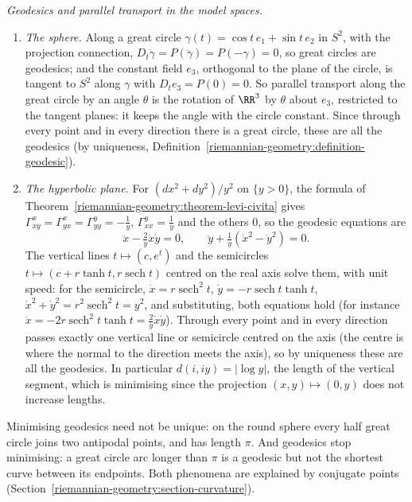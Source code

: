 \begin{example}\label{riemannian-geometry:example-geodesics-models}
\emph{Geodesics and parallel transport in the model spaces.}
\begin{enumerate}
\item \emph{The sphere.} Along a great circle $\gamma(t) = \cos t\,e_1 + \sin t\,e_2$ in $S^2$, with the projection connection, $D_t\dot\gamma = P(\ddot\gamma) = P(-\gamma) = 0$, so great circles are geodesics; and
the constant field $e_3$, orthogonal to the plane of the circle, is tangent to $S^2$ along $\gamma$ with $D_te_3 = P(0) = 0$. So parallel transport along the great circle by an angle $\theta$ is the rotation of
$\RR^3$ by $\theta$ about $e_3$, restricted to the tangent planes: it keeps the angle with the circle constant. Since through every point and in every direction there is a great circle, these are all the
geodesics (by uniqueness, Definition~\ref{riemannian-geometry:definition-geodesic}).
\item \emph{The hyperbolic plane.} For $(dx^2 + dy^2)/y^2$ on $\{y > 0\}$, the formula of Theorem~\ref{riemannian-geometry:theorem-levi-civita} gives $\Gamma^x_{xy} = \Gamma^x_{yx} = \Gamma^y_{yy} = -\frac1y$,
$\Gamma^y_{xx} = \frac1y$ and the others $0$, so the geodesic equations are
\[
\ddot x - \tfrac2y\dot x\dot y = 0, \qquad \ddot y + \tfrac1y(\dot x^2 - \dot y^2) = 0 .
\]
The vertical lines $t \mapsto (c, e^t)$ and the semicircles $t \mapsto (c + r\tanh t, r\operatorname{sech}t)$ centred on the real axis solve them, with unit speed: for the semicircle,
$\dot x = r\operatorname{sech}^2t$, $\dot y = -r\operatorname{sech}t\tanh t$, $\dot x^2 + \dot y^2 = r^2\operatorname{sech}^2t = y^2$, and substituting, both equations hold (for instance
$\ddot x = -2r\operatorname{sech}^2t\tanh t = \frac2y\dot x\dot y$). Through every point and in every direction passes exactly one vertical line or semicircle centred on the axis (the centre is where the
normal to the direction meets the axis), so by uniqueness these are all the geodesics. In particular $d(i, iy) = |\log y|$, the length of the vertical segment, which is minimising since the projection
$(x, y) \mapsto (0, y)$ does not increase lengths.
\end{enumerate}
\end{example}

\begin{remark}\label{riemannian-geometry:remark-non-unique-geodesics}
Minimising geodesics need not be unique: on the round sphere every half great circle joins two antipodal points, and has length $\pi$. And geodesics stop minimising: a great circle arc longer than $\pi$ is a geodesic
but not the shortest curve between its endpoints. Both phenomena are explained by conjugate points (Section~\ref{riemannian-geometry:section-curvature}).
\end{remark}

